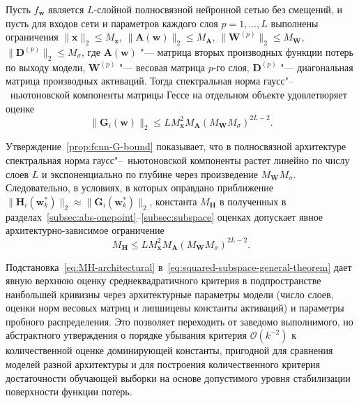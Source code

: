 \begin{proposition}
    \label{prop:fcnn-G-bound}
    Пусть $f_{\mathbf{w}}$ является $L$-слойной полносвязной нейронной сетью без смещений, и пусть для входов сети и параметров каждого слоя $p=1, \ldots, L$ выполнены ограничения $\|\mathbf{x}\|_2 \leqslant M_{\mathbf{x}}$, $\|\mathbf{A}(\mathbf{w})\|_2 \leqslant M_{\mathbf{A}}$, $\|\mathbf{W}^{(p)}\|_2 \leqslant M_{\mathbf{W}}$, $\|\mathbf{D}^{(p)}\|_2 \leqslant M_{\sigma}$, где $\mathbf{A}(\mathbf{w})$ "--- матрица вторых производных функции потерь по выходу модели, $\mathbf{W}^{(p)}$ "--- весовая матрица $p$-го слоя, $\mathbf{D}^{(p)}$ "--- диагональная матрица производных активаций. Тогда спектральная норма гаусс"--~ньютоновской компоненты матрицы Гессе на отдельном объекте удовлетворяет оценке
    \begin{equation}
        \label{eq:fcnn-G-bound}
        \|\mathbf{G}_i(\mathbf{w})\|_2
        \leqslant
        L M_{\mathbf{x}}^2 M_{\mathbf{A}} \left(M_{\mathbf{W}} M_{\sigma}\right)^{2L-2}.
    \end{equation}
\end{proposition}

Утверждение~\ref{prop:fcnn-G-bound} показывает, что в полносвязной архитектуре спектральная норма гаусс"--~ньютоновской компоненты растет линейно по числу слоев $L$ и экспоненциально по глубине через произведение $M_{\mathbf W} M_\sigma$. Следовательно, в условиях, в которых оправдано приближение $\|\mathbf H_i(\mathbf w_k^*)\|_2 \approx \|\mathbf G_i(\mathbf w_k^*)\|_2$, константа $M_{\mathbf H}$ в полученных в разделах~\ref{subsec:abs-onepoint}--\ref{subsec:subspace} оценках допускает явное архитектурно-зависимое ограничение
\begin{equation}
    \label{eq:MH-architectural}
    M_{\mathbf H} \leqslant L M_{\mathbf x}^2 M_{\mathbf A} \left(M_{\mathbf W} M_\sigma\right)^{2L-2}.
\end{equation}

Подстановка~\eqref{eq:MH-architectural} в~\eqref{eq:squared-subspace-general-theorem} дает явную верхнюю оценку среднеквадратичного критерия в подпространстве наибольшей кривизны через архитектурные параметры модели (число слоев, оценки норм весовых матриц и липшицевы константы активаций) и параметры пробного распределения. Это позволяет переходить от заведомо выполнимого, но абстрактного утверждения о порядке убывания критерия $\mathcal O(k^{-2})$ к количественной оценке доминирующей константы, пригодной для сравнения моделей разной архитектуры и для построения количественного критерия достаточности обучающей выборки на основе допустимого уровня стабилизации поверхности функции потерь.

